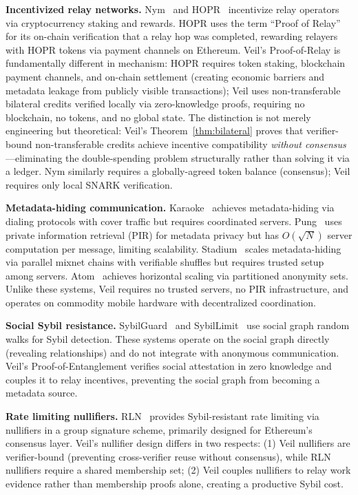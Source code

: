 \documentclass[11pt,a4paper]{article}
\begin{document}
\textbf{Incentivized relay networks.} Nym~\cite{nym-whitepaper} and HOPR~\cite{hopr} incentivize relay operators via cryptocurrency staking and rewards. HOPR uses the term ``Proof of Relay'' for its on-chain verification that a relay hop was completed, rewarding relayers with HOPR tokens via payment channels on Ethereum. Veil's Proof-of-Relay is fundamentally different in mechanism: HOPR requires token staking, blockchain payment channels, and on-chain settlement (creating economic barriers and metadata leakage from publicly visible transactions); Veil uses non-transferable bilateral credits verified locally via zero-knowledge proofs, requiring no blockchain, no tokens, and no global state. The distinction is not merely engineering but theoretical: Veil's Theorem~\ref{thm:bilateral} proves that verifier-bound non-transferable credits achieve incentive compatibility \emph{without consensus}---eliminating the double-spending problem structurally rather than solving it via a ledger. Nym similarly requires a globally-agreed token balance (consensus); Veil requires only local SNARK verification.

\textbf{Metadata-hiding communication.} Karaoke~\cite{karaoke} achieves metadata-hiding via dialing protocols with cover traffic but requires coordinated servers. Pung~\cite{pung} uses private information retrieval (PIR) for metadata privacy but has $O(\sqrt{N})$ server computation per message, limiting scalability. Stadium~\cite{stadium} scales metadata-hiding via parallel mixnet chains with verifiable shuffles but requires trusted setup among servers. Atom~\cite{atom} achieves horizontal scaling via partitioned anonymity sets. Unlike these systems, Veil requires no trusted servers, no PIR infrastructure, and operates on commodity mobile hardware with decentralized coordination.

\textbf{Social Sybil resistance.} SybilGuard~\cite{sybilguard} and SybilLimit~\cite{sybillimit} use social graph random walks for Sybil detection. These systems operate on the social graph directly (revealing relationships) and do not integrate with anonymous communication. Veil's Proof-of-Entanglement verifies social attestation in zero knowledge and couples it to relay incentives, preventing the social graph from becoming a metadata source.

\textbf{Rate limiting nullifiers.} RLN~\cite{rln} provides Sybil-resistant rate limiting via nullifiers in a group signature scheme, primarily designed for Ethereum's consensus layer. Veil's nullifier design differs in two respects: (1) Veil nullifiers are verifier-bound (preventing cross-verifier reuse without consensus), while RLN nullifiers require a shared membership set; (2) Veil couples nullifiers to relay work evidence rather than membership proofs alone, creating a productive Sybil cost.
\end{document}
